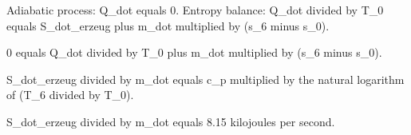 Adiabatic process: Q_dot equals 0.  
Entropy balance:  
Q_dot divided by T_0 equals S_dot_erzeug plus m_dot multiplied by (s_6 minus s_0).  

0 equals Q_dot divided by T_0 plus m_dot multiplied by (s_6 minus s_0).  

S_dot_erzeug divided by m_dot equals c_p multiplied by the natural logarithm of (T_6 divided by T_0).  

S_dot_erzeug divided by m_dot equals 8.15 kilojoules per second.